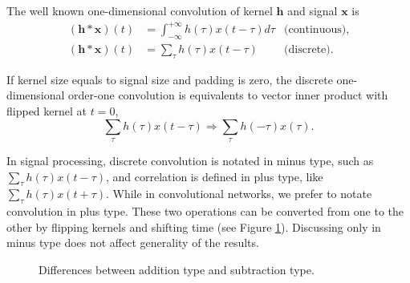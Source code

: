 \documentclass[twoside,11pt]{article}
\def\tvar#1{\mathbf{#1}} %
\def\intinf{\int_{-\infty}^{+\infty}\!}
\begin{document}
The well known one-dimensional convolution \citep{Gonzalez2017-la} of kernel \(\tvar{h}\) and signal \(\tvar{x}\) is
\begin{equation}
  \begin{aligned}
    (\tvar{h} * \tvar{x})(t) & = \intinf h(\tau) x(t - \tau) d \tau & \text{(continuous)}, \\
    (\tvar{h} * \tvar{x})(t) & = \sum_{\tau} h(\tau) x(t - \tau)    & \text{(discrete)}.
  \end{aligned}
  \label{equ:def-convolution-1d}
\end{equation}

\begin{remark}
  If kernel size equals to signal size and padding is zero, the discrete one-dimensional order-one convolution is equivalents to vector inner product with flipped kernel at \(t = 0\),
  \begin{equation*}
    \sum_{\tau} h(\tau) x(t - \tau) \Rightarrow \sum_{\tau} h(-\tau) x(\tau).
  \end{equation*}
\end{remark}

In signal processing, discrete convolution is notated in minus type, such as \(\sum_{\tau} h(\tau) x(t - \tau)\), and correlation is defined in plus type, like \(\sum_{\tau} h(\tau) x(t+\tau)\).
While in convolutional networks, we prefer to notate convolution in plus type.
These two operations can be converted from one to the other by flipping kernels and shifting time (see Figure \ref{fig:difference-between-addition-and-subtraction-conv-type}).
Discussing only in minus type does not affect generality of the results.

\begin{figure}[htb]
  \centering
  \caption{Differences between addition type and subtraction type.}
  \label{fig:difference-between-addition-and-subtraction-conv-type}
\end{figure}
\end{document}
